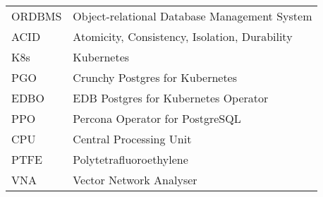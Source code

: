 
\seznamzkr

\begin{tabular}{ll}
    ORDBMS & Object-relational Database Management System  \\
    ACID   & Atomicity, Consistency, Isolation, Durability \\
    K8s    & Kubernetes                                    \\
    PGO    & Crunchy Postgres for Kubernetes               \\
    EDBO   & EDB Postgres for Kubernetes Operator          \\
    PPO    & Percona Operator for PostgreSQL               \\
    CPU    & Central Processing Unit                       \\
    PTFE   & Polytetrafluoroethylene                       \\
    VNA    & Vector Network Analyser                       \\
\end{tabular}

